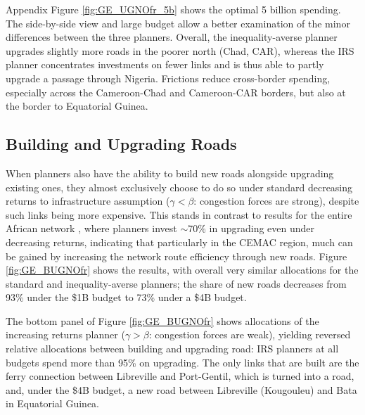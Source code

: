 \documentclass[a4paper]{article}
\begin{document}
Appendix Figure \ref{fig:GE_UGNOfr_5b} shows the optimal 5 billion spending. The side-by-side view and large budget allow a better examination of the minor differences between the three planners. Overall, the inequality-averse planner upgrades slightly more roads in the poorer north (Chad, CAR), whereas the IRS planner concentrates investments on fewer links and is thus able to partly upgrade a passage through Nigeria. Frictions reduce cross-border spending, especially across the Cameroon-Chad and Cameroon-CAR borders, but also at the border to Equatorial Guinea. 

\subsection{Building and Upgrading Roads} 

When planners also have the ability to build new roads alongside upgrading existing ones, they almost exclusively choose to do so under standard decreasing returns to infrastructure assumption ($\gamma < \beta$: congestion forces are strong), despite such links being more expensive. This stands in contrast to results for the entire African network \citep{krantz2024optimal}, where planners invest $\sim$70\% in upgrading even under decreasing returns, indicating that particularly in the CEMAC region, much can be gained by increasing the network route efficiency through new roads. Figure \ref{fig:GE_BUGNOfr} shows the results, with overall very similar allocations for the standard and inequality-averse planners; the share of new roads decreases from 93\% under the \$1B budget to 73\% under a \$4B budget. \newline 

The bottom panel of Figure \ref{fig:GE_BUGNOfr} shows allocations of the increasing returns planner ($\gamma > \beta$: congestion forces are weak), yielding reversed relative allocations between building and upgrading road: IRS planners at all budgets spend more than 95\% on upgrading. The only links that are built are the ferry connection between Libreville and Port-Gentil, which is turned into a road, and, under the \$4B budget, a new road between Libreville (Kougouleu) and Bata in Equatorial Guinea. \newline
\end{document}
